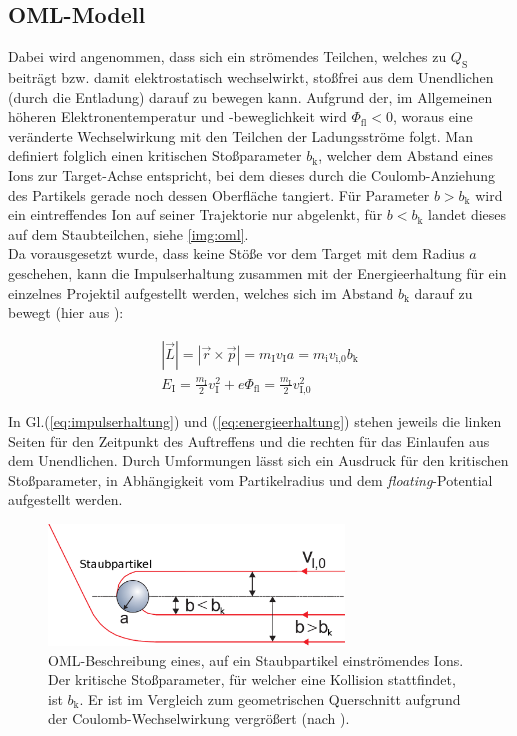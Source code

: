 \documentclass[numbers=noenddot,a4paper,notitlepage,twoside,BCOR15mm]{scrbook}
\newcommand{\ix}[1]{_\text{#1}}
\newcommand{\tilt}[1]{\textit{#1}}
\begin{document}
			\subsection{OML-Modell}\label{subsub:oml}

			Dabei wird angenommen, dass sich ein strömendes Teilchen, welches zu $Q\ix{S}$ beiträgt bzw. damit elektrostatisch wechselwirkt, stoßfrei aus dem Unendlichen (durch die Entladung) darauf zu bewegen kann. Aufgrund der, im Allgemeinen höheren Elektronentemperatur und -beweglichkeit wird $\Phi\ix{fl}<0$, woraus eine veränderte Wechselwirkung mit den Teilchen der Ladungsströme folgt. Man definiert folglich einen kritischen Stoßparameter $b\ix{k}$, welcher dem Abstand eines Ions zur Target-Achse entspricht, bei dem dieses durch die Coulomb-Anziehung des Partikels gerade noch dessen Oberfläche tangiert. Für Parameter $b>b\ix{k}$ wird ein eintreffendes Ion auf seiner Trajektorie nur abgelenkt, für $b<b\ix{k}$ landet dieses auf dem Staubteilchen, siehe \autoref{img:oml}.\\
			Da vorausgesetzt wurde, dass keine Stöße vor dem Target mit dem Radius $a$ geschehen, kann die Impulserhaltung zusammen mit der Energieerhaltung für ein einzelnes Projektil aufgestellt werden, welches sich im Abstand $b\ix{k}$ darauf zu bewegt (hier aus \cite{Melzer12}):

				\begin{align}
					|\vec{L}|=|\vec{r}\times\vec{p}|=m\ix{I}v\ix{I}a=m\ix{i}v\ix{i,0}b\ix{k} \label{eq:impulserhaltung} \\
					E\ix{I}=\frac{m\ix{I}}{2}v\ix{I}^2+e\Phi\ix{fl}=\frac{m\ix{I}}{2}v\ix{I,0}^2 \label{eq:energieerhaltung}
				\end{align}

			In Gl.(\ref{eq:impulserhaltung}) und (\ref{eq:energieerhaltung}) stehen jeweils die linken Seiten für den Zeitpunkt des Auftreffens und die rechten für das Einlaufen aus dem Unendlichen. Durch Umformungen lässt sich ein Ausdruck für den kritischen Stoßparameter, in Abhängigkeit vom Partikelradius und dem \tilt{floating}-Potential aufgestellt werden.

						\begin{figure}[!t]
							\centering
							\includegraphics[width=0.7\textwidth, height=0.3\textwidth]{figs/orbitalmotionlimitmelzer.png}
							\caption{OML-Beschreibung eines, auf ein Staubpartikel einströmendes Ions. Der kritische Stoßparameter, für welcher eine Kollision stattfindet, ist $b\ix{k}$. Er ist im Vergleich zum geometrischen Querschnitt aufgrund der Coulomb-Wechselwirkung vergrößert (nach \cite{Melzer12}).}
							\label{img:oml}
						\end{figure}
\end{document}
